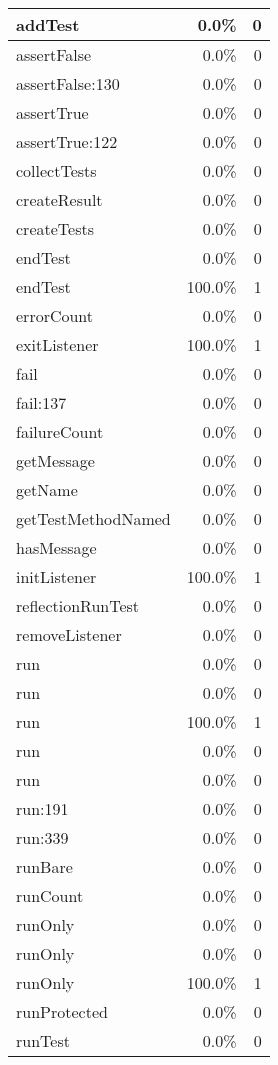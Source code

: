 \documentclass[a4paper]{article}
\begin{document}
\begin{longtable}{|l|r|r|}
\hline
addTest & 0.0\% & 0 \\
\hline
assertFalse & 0.0\% & 0 \\
\hline
assertFalse:130 & 0.0\% & 0 \\
\hline
assertTrue & 0.0\% & 0 \\
\hline
assertTrue:122 & 0.0\% & 0 \\
\hline
collectTests & 0.0\% & 0 \\
\hline
createResult & 0.0\% & 0 \\
\hline
createTests & 0.0\% & 0 \\
\hline
endTest & 0.0\% & 0 \\
\hline
endTest & 100.0\% & 1 \\
\hline
errorCount & 0.0\% & 0 \\
\hline
exitListener & 100.0\% & 1 \\
\hline
fail & 0.0\% & 0 \\
\hline
fail:137 & 0.0\% & 0 \\
\hline
failureCount & 0.0\% & 0 \\
\hline
getMessage & 0.0\% & 0 \\
\hline
getName & 0.0\% & 0 \\
\hline
getTestMethodNamed & 0.0\% & 0 \\
\hline
hasMessage & 0.0\% & 0 \\
\hline
initListener & 100.0\% & 1 \\
\hline
reflectionRunTest & 0.0\% & 0 \\
\hline
removeListener & 0.0\% & 0 \\
\hline
run & 0.0\% & 0 \\
\hline
run & 0.0\% & 0 \\
\hline
run & 100.0\% & 1 \\
\hline
run & 0.0\% & 0 \\
\hline
run & 0.0\% & 0 \\
\hline
run:191 & 0.0\% & 0 \\
\hline
run:339 & 0.0\% & 0 \\
\hline
runBare & 0.0\% & 0 \\
\hline
runCount & 0.0\% & 0 \\
\hline
runOnly & 0.0\% & 0 \\
\hline
runOnly & 0.0\% & 0 \\
\hline
runOnly & 100.0\% & 1 \\
\hline
runProtected & 0.0\% & 0 \\
\hline
runTest & 0.0\% & 0 \\

\end{longtable}
\end{document}
